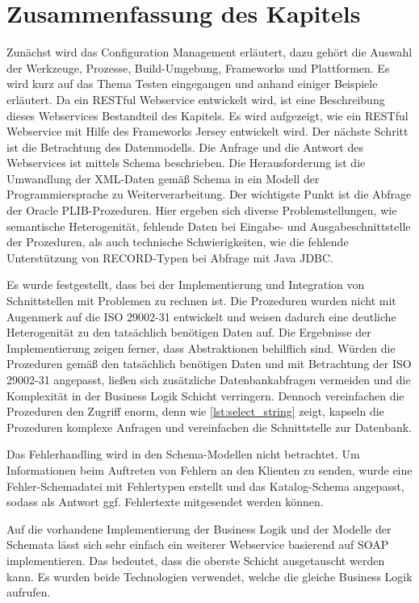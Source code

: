 \section{Zusammenfassung des Kapitels}

Zunächst wird das Configuration Management erläutert, dazu gehört die Auswahl der Werkzeuge, Prozesse, Build-Umgebung, Frameworks und Plattformen. Es wird kurz auf das Thema Testen eingegangen und anhand einiger Beispiele erläutert. Da ein \gls{REST}ful \gls{Webservice} entwickelt wird, ist eine Beschreibung dieses Webservices Bestandteil des Kapitels. Es wird aufgezeigt, wie ein  \gls{REST}ful \gls{Webservice} mit Hilfe des Frameworks Jersey entwickelt wird. 
Der nächste Schritt ist die Betrachtung des Datenmodells. Die Anfrage und die Antwort des  \glspl{Webservice} ist mittels Schema beschrieben. Die Herausforderung ist die Umwandlung der XML-Daten gemäß Schema in ein Modell der Programmiersprache zu Weiterverarbeitung.  
Der wichtigste Punkt ist die Abfrage der \gls{Oracle} \gls{PLIB}-Prozeduren. Hier ergeben sich diverse Problemstellungen, wie semantische Heterogenität, fehlende Daten bei Eingabe- und Ausgabeschnittstelle der Prozeduren, als auch technische Schwierigkeiten, wie die fehlende Unterstützung von RECORD-Typen bei Abfrage mit Java JDBC.

Es wurde festgestellt, dass bei der Implementierung und Integration von Schnittstellen mit Problemen zu rechnen ist. Die Prozeduren wurden nicht mit Augenmerk auf die ISO 29002-31 entwickelt und weisen dadurch eine deutliche Heterogenität zu den tatsächlich benötigen Daten auf. Die Ergebnisse der Implementierung zeigen ferner, dass Abstraktionen behilflich sind. Würden die Prozeduren gemäß den tatsächlich benötigen Daten und mit Betrachtung der ISO 29002-31 angepasst, ließen sich zusätzliche Datenbankabfragen vermeiden und die Komplexität in der Business Logik Schicht verringern. Dennoch vereinfachen die Prozeduren den Zugriff enorm, denn wie \autoref{lst:select_string} zeigt, kapseln die Prozeduren komplexe Anfragen und vereinfachen die Schnittstelle zur Datenbank. 
 
Das Fehlerhandling wird in den Schema-Modellen nicht betrachtet. Um Informationen beim Auftreten von Fehlern an den Klienten zu senden, wurde eine Fehler-Schemadatei mit Fehlertypen erstellt und das Katalog-Schema angepasst, sodass als Antwort ggf. Fehlertexte mitgesendet werden können. 

Auf die vorhandene Implementierung der Business Logik und der Modelle der Schemata lässt sich sehr einfach ein weiterer \gls{Webservice} basierend auf SOAP implementieren. Das bedeutet, dass die oberste Schicht ausgetauscht werden kann. Es wurden beide Technologien verwendet, welche die gleiche Business Logik aufrufen. 

